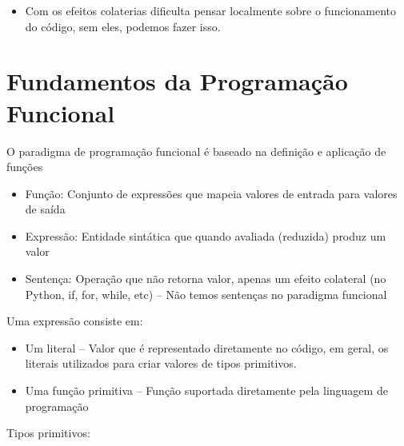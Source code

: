 \documentclass[12pt]{article}
\begin{document}
\begin{itemize}
\begin{itemize}
\begin{verbatim}
def soma_indices(lst: list[int], a: int, b: int) -> int:
    return indice(lst, a) + indice(lst, b)
        \end{verbatim}
        Não é possível que as duas definições são equivalentes sem olhar o 
        código da função \verb|indice|. Se ela tiver efeitos colaterais, 
        então as definições não podem ser equivalentes.
    \end{itemize}
    \item Com os efeitos colaterias dificulta pensar localmente sobre o 
    funcionamento do código, sem eles, podemos fazer isso.
\end{itemize}

\section{Fundamentos da Programação Funcional}
O paradigma de programação funcional é baseado na definição e aplicação de funções
\begin{itemize}
    \item Função: Conjunto de expressões que mapeia valores de entrada para 
    valores de saída
    \item Expressão: Entidade sintática que quando avaliada (reduzida) produz um 
    valor
    \item Sentença: Operação que não retorna valor, apenas um efeito colateral 
    (no Python, if, for, while, etc) -- Não temos sentenças no paradigma funcional
\end{itemize}
Uma expressão consiste em:
\begin{itemize}
    \item Um literal -- Valor que é representado diretamente no código, em geral, 
    os literais utilizados para criar valores de tipos primitivos.
    \item Uma função primitiva -- Função suportada diretamente pela linguagem 
    de programação
\end{itemize}
Tipos primitivos:
\end{document}
